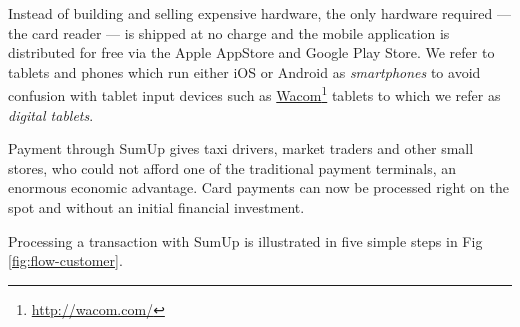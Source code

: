 \documentclass[a4paper, oneside]{csthesis}
\newcommand\fnurl[2]{%
  \href{#2}{#1}\footnote{\url{#2}}%
}
\begin{document}
Instead of building and selling expensive hardware, the only hardware required --- the card reader --- is shipped at no charge and the mobile application is distributed for free via the Apple AppStore and Google Play Store. We refer to tablets and phones which run either iOS or Android as \emph{smartphones} to avoid confusion with tablet input devices such as \fnurl{Wacom}{http://wacom.com/} tablets to which we refer as \emph{digital tablets}.

Payment through SumUp gives taxi drivers, market traders and other small stores, who could not afford one of the traditional payment terminals, an enormous economic advantage. Card payments can now be processed right on the spot and without an initial financial investment.


Processing a transaction with SumUp is illustrated in five simple steps in Fig \ref{fig:flow-customer}.
\end{document}
